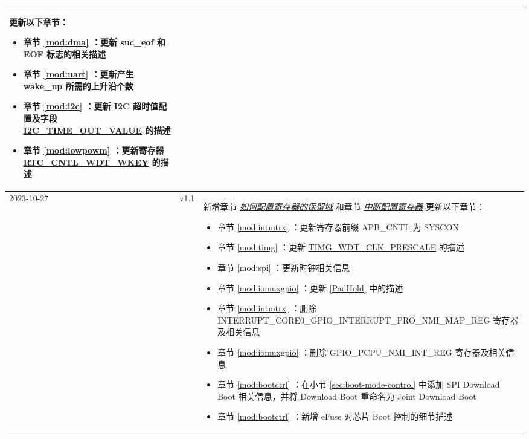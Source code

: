 \begin{longtable}[l]{ | m{2cm} | m{1.5cm} | m{12cm} | }
     \newline
     更新以下章节：
     \begin{itemize}
        \item 章节 \ref{mod:dma} \textit{\nameref{mod:dma}}：更新 suc\_eof 和 EOF 标志的相关描述 %
        \item 章节 \ref{mod:uart} \textit{\nameref{mod:uart}}：更新产生 wake\_up 所需的上升沿个数 %
        \item 章节 \ref{mod:i2c} \textit{\nameref{mod:i2c}}：更新 I2C 超时值配置及字段 \hyperref[fielddesc:I2CTIMEOUTVALUE]{I2C\_TIME\_OUT\_VALUE} 的描述 %
        \item 章节 \ref{mod:lowpowm} \textit{\nameref{mod:lowpowm}}：更新寄存器 \hyperref[fielddesc:RTCCNTLWDTWKEY]{RTC\_CNTL\_WDT\_WKEY} 的描述 %
     \end{itemize}
     \\\hline
     2023-10-27 & v1.1 &
     新增章节 \hyperref[programming-reserved-field]{\textit{如何配置寄存器的保留域}} 和章节 \hyperref[interrupt-config-registers]{\textit{中断配置寄存器}} \newline
     更新以下章节：
     \begin{itemize}
        \item 章节 \ref{mod:intmtrx} \textit{\nameref{mod:intmtrx}}：更新寄存器前缀 APB\_CNTL 为 SYSCON %
        \item 章节 \ref{mod:timg} \textit{\nameref{mod:timg}}：更新 \hyperref[fielddesc:TIMGWDTCLKPRESCALE]{TIMG\_WDT\_CLK\_PRESCALE} 的描述 %
        \item 章节 \ref{mod:spi} \textit{\nameref{mod:spi}}：更新时钟相关信息 %
        \item 章节 \ref{mod:iomuxgpio} \textit{\nameref{mod:iomuxgpio}}：更新 \ref{PadHold} 中的描述 %
        \item 章节 \ref{mod:intmtrx} \textit{\nameref{mod:intmtrx}}：删除 INTERRUPT\_CORE0\_GPIO\_INTERRUPT\_PRO\_NMI\_MAP\_REG 寄存器及相关信息 %
        \item 章节 \ref{mod:iomuxgpio} \textit{\nameref{mod:iomuxgpio}}：删除 GPIO\_PCPU\_NMI\_INT\_REG 寄存器及相关信息 %
        \item 章节 \ref{mod:bootctrl} \textit{\nameref{mod:bootctrl}}：在小节 \ref{sec:boot-mode-control} 中添加 SPI Download Boot 相关信息，并将 Download Boot 重命名为 Joint Download Boot %
        \item 章节 \ref{mod:bootctrl} \textit{\nameref{mod:bootctrl}}：新增 eFuse 对芯片 Boot 控制的细节描述 %

\end{itemize}
\end{longtable}
